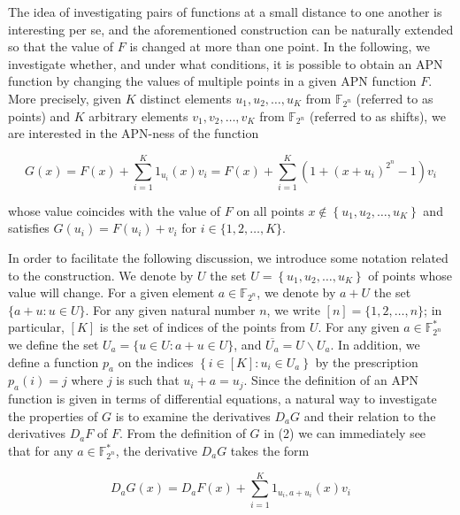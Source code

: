 \documentclass[10pt]{article}
\begin{document}
The idea of investigating pairs of functions at a small distance to one another is interesting per se, and the aforementioned construction can be naturally extended so that the value of $F$ is changed at more than one point. In the following, we investigate whether, and under what conditions, it is possible to obtain an APN function by changing the values of multiple points in a given APN function $F$. More precisely, given $K$ distinct elements $u_{1}, u_{2}, \ldots, u_{K}$ from $\mathbb{F}_{2^{n}}$ (referred to as points) and $K$ arbitrary elements $v_{1}, v_{2}, \ldots, v_{K}$ from $\mathbb{F}_{2^{n}}$ (referred to as shifts), we are interested in the APN-ness of the function


\begin{equation*}
G(x)=F(x)+\sum_{i=1}^{K} 1_{u_{i}}(x) v_{i}=F(x)+\sum_{i=1}^{K}\left(1+\left(x+u_{i}\right)^{2^{n}}-1\right) v_{i} \tag{2}
\end{equation*}


whose value coincides with the value of $F$ on all points $x \notin\left\{u_{1}, u_{2}, \ldots, u_{K}\right\}$ and satisfies $G\left(u_{i}\right)=F\left(u_{i}\right)+v_{i}$ for $i \in\{1,2, \ldots, K\}$.

In order to facilitate the following discussion, we introduce some notation related to the construction. We denote by $U$ the set $U=\left\{u_{1}, u_{2}, \ldots, u_{K}\right\}$ of points whose value will change. For a given element $a \in \mathbb{F}_{2^{n}}$, we denote by $a+U$ the set $\{a+u: u \in U\}$. For any given natural number $n$, we write $[n]=\{1,2, \ldots, n\}$; in particular, $[K]$ is the set of indices of the points from $U$. For any given $a \in \mathbb{F}_{2^{n}}^{*}$ we define the set $U_{a}=\{u \in U: a+u \in U\}$, and $\overline{U_{a}}=U \backslash U_{a}$. In addition, we define a function $p_{a}$ on the indices $\left\{i \in[K]: u_{i} \in U_{a}\right\}$ by the prescription $p_{a}(i)=j$ where $j$ is such that $u_{i}+a=u_{j}$. Since the definition of an APN function is given in terms of differential equations, a natural way to investigate the properties of $G$ is to examine the derivatives $D_{a} G$ and their relation to the derivatives $D_{a} F$ of $F$. From the definition of $G$ in (2) we can immediately see\\
that for any $a \in \mathbb{F}_{2^{n}}^{*}$, the derivative $D_{a} G$ takes the form


\begin{equation*}
D_{a} G(x)=D_{a} F(x)+\sum_{i=1}^{K} 1_{u_{i}, a+u_{i}}(x) v_{i} \tag{3}
\end{equation*}
\end{document}
